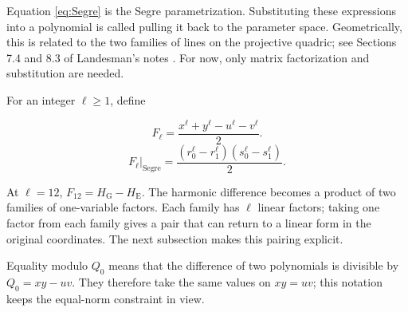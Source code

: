\documentclass[a4paper,11pt]{article}
\theoremstyle{definition}
\begin{document}
Equation \eqref{eq:Segre} is the Segre parametrization.
Substituting these expressions into a polynomial is called pulling it back
to the parameter space. Geometrically, this is related to the two families
of lines on the projective quadric; see Sections 7.4 and 8.3 of
Landesman's notes \cite{Landesman2016}.
For now, only matrix factorization and substitution are needed.

For an integer \(\ell\geq1\), define

\begin{equation}\label{eq:Fell}
 F_\ell=\frac{x^\ell+y^\ell-u^\ell-v^\ell}{2}.
\end{equation}
\begin{equation}\label{eq:Segrefactor}
 F_\ell\big|_{\mathrm{Segre}}
 =\frac{(r_0^\ell-r_1^\ell)(s_0^\ell-s_1^\ell)}{2}.
\end{equation}

At \(\ell=12\), \(F_{12}=H_{\mathrm G}-H_{\mathrm E}\).
The harmonic difference becomes a product of two families of one-variable factors.
Each family has \(\ell\) linear factors; taking one factor from each family
gives a pair that can return to a linear form in the original coordinates.
The next subsection makes this pairing explicit.

Equality modulo \(Q_0\) means that the difference of two polynomials
is divisible by \(Q_0=xy-uv\). They therefore take the same values on
\(xy=uv\); this notation keeps the equal-norm constraint in view.

\end{document}
